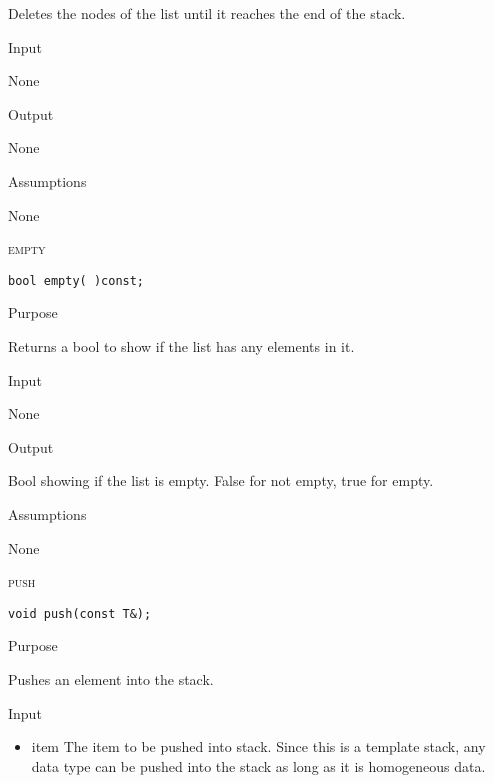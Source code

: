 \documentclass[pdftex, 11pt]{article}
\begin{document}
\begin{description}
\begin{description}
				Deletes the nodes of the list until it reaches
				the end of the stack.

			\item{Input}

				None

			\item{Output}
				
				None

			\item{Assumptions}

				None

		\end{description}
	\item{\textsc{empty}}

		\begin{lstlisting}
bool empty( )const;
		\end{lstlisting}

		\begin{description}
			\item{Purpose}
				
				Returns a bool to show if the list has any
				elements in it.

			\item{Input}

				None

			\item{Output}
				
				Bool showing if the list is empty. False for not
				empty, true for empty.

			\item{Assumptions}

				None

		\end{description}
	\item{\textsc{push}}

		\begin{lstlisting}
void push(const T&);
		\end{lstlisting}

		\begin{description}
			\item{Purpose}
				
				Pushes an element into the stack.

			\item{Input}

				\begin{itemize}
					\item{item}
						The item to be pushed into
						stack. Since this is a template
						stack, any data type can be
						pushed into the stack as long as
						it is homogeneous data.
				\end{itemize}


\end{description}
\end{description}
\end{document}
